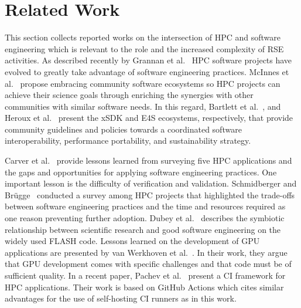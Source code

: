 
\section{Related Work}
\label{sec:Related-Work}

This section collects reported works on the intersection of HPC and software engineering which is relevant to the role and the increased complexity of RSE activities.
As described recently by Grannan et al.~\cite{grannan2020understanding} HPC software projects have evolved to greatly take advantage of software engineering practices.
McInnes et al.~\cite{mcinnes2021community} propose embracing community software ecosystems so HPC projects can achieve their science goals through enriching the synergies with other communities with similar software needs.
In this regard, Bartlett et al.~\cite{10.14529/jsfi170104}, and Heroux et al.~\cite{heroux2020e4s} present the xSDK and E4S ecosystems, respectively, that provide community guidelines and policies towards a coordinated software interoperability, performance portability, and sustainability strategy.

Carver et al.~\cite{4222616} provide lessons learned from surveying five HPC applications and the gaps and opportunities for applying software engineering practices.
One important lesson is the difficulty of verification and validation.
Schmidberger and Brügge~\cite{6341492} conducted a survey among HPC projects that highlighted the trade-offs between software engineering practices and the time and resources required as one reason preventing further adoption.
Dubey et al.~\cite{dubey2014evolution} describes the symbiotic relationship between scientific research and good software engineering on the widely used FLASH code.
Lessons learned on the development of GPU applications are presented by van Werkhoven et al.~\cite{van2020lessons}.
In their work, they argue that GPU development comes with specific challenges and that code must be of sufficient quality.
In a recent paper, Pachev et al.~\cite{10.1145/3491418.3535124} present a CI framework for HPC applications.
Their work is based on GitHub Actions which cites similar advantages for the use of self-hosting CI runners as in this work.

